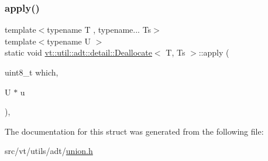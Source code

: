 \subsubsection{\texorpdfstring{apply()}{apply()}}
{\footnotesize\ttfamily template$<$typename T , typename... Ts$>$ \\
template$<$typename U $>$ \\
static void \hyperlink{structvt_1_1util_1_1adt_1_1detail_1_1_deallocate}{vt\+::util\+::adt\+::detail\+::\+Deallocate}$<$ T, Ts $>$\+::apply (\begin{DoxyParamCaption}\item[{uint8\+\_\+t}]{which,  }\item[{U $\ast$}]{u }\end{DoxyParamCaption})\hspace{0.3cm}{\ttfamily [inline]}, {\ttfamily [static]}}



The documentation for this struct was generated from the following file\+:\begin{DoxyCompactItemize}
\item 
src/vt/utils/adt/\hyperlink{union_8h}{union.\+h}\end{DoxyCompactItemize}
